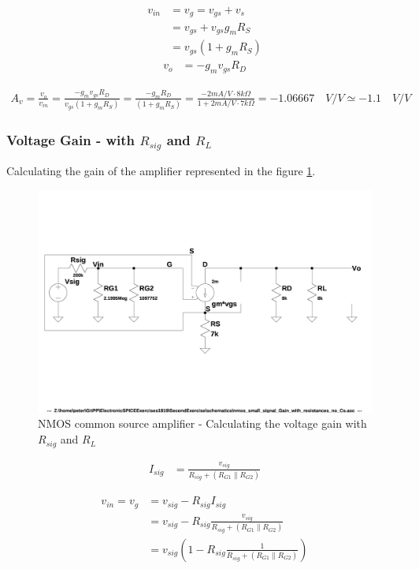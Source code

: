 \documentclass[10pt,a4paper]{book}
\begin{document}
\begin{align}
v_{in} &= v_{g} = v_{gs}+v_s\\
&= v_{gs} + v_{gs} g_m R_S\\
&= v_{gs}(1+ g_m R_S)
\end{align}
\begin{align}
v_{o} &= - g_m v_{gs} R_D
\end{align}

\begin{align}
A_v = \frac{v_o}{v_{in}} = \frac{- g_m v_{gs} R_D}{v_{gs}(1+ g_m R_S)} = \frac{- g_m R_D}{(1+ g_m R_S)} = \frac{- 2mA/V \cdot 8k\Omega}{1+2mA/V \cdot 7k\Omega} = - 1.06667 \quad V/V \simeq - 1.1 \quad V/V \label{AvNoCs}
\end{align}

\subsubsection{Voltage Gain - with $R_{sig}$ and $R_L$}\label{GvSecNoCs}
Calculating the gain of the amplifier represented in the figure \ref{nmos_pi_gain_with_resistances_no_Cs}.

\begin{figure}[h]
  \centering
  \includegraphics[width=12cm]{schematics/nmos_small_signal_with_resistances_no_Cs.jpg}
  \caption{NMOS common source amplifier - Calculating the voltage gain with $R_{sig}$ and $R_L$}
  \label{nmos_pi_gain_with_resistances_no_Cs}
\end{figure}

\begin{align}
I_{sig} &= \frac{v_{sig}}{R_{sig} + (R_{G1} \parallel R_{G2})}
\end{align}

\begin{align}
v_{in} = v_{g} &= v_{sig} - R_{sig} I_{sig}\\
&= v_{sig} - R_{sig} \frac{v_{sig}}{R_{sig} + (R_{G1} \parallel R_{G2})}\\
&= v_{sig} \left(1 - R_{sig} \frac{1}{R_{sig} + (R_{G1} \parallel R_{G2})}\right)
\end{align}
\end{document}

